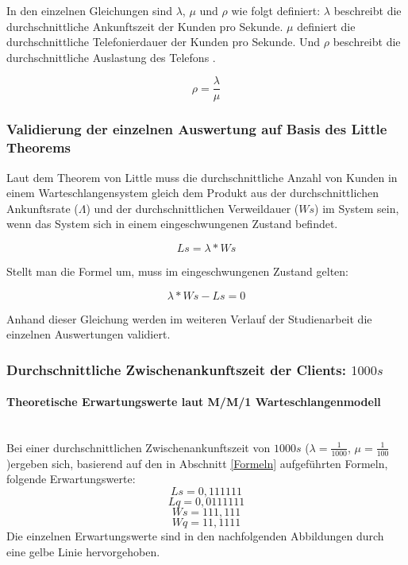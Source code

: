 In den einzelnen Gleichungen sind $\lambda$, $\mu$ und $\rho$ wie folgt definiert: $\lambda$ beschreibt die durchschnittliche Ankunftszeit der Kunden pro Sekunde. $\mu$ definiert die durchschnittliche Telefonierdauer der Kunden pro Sekunde. Und $\rho$ beschreibt die durchschnittliche Auslastung des Telefons \cite{MM1Formeln}. 

\begin{equation}
\rho=\frac{\lambda}{\mu}
\end{equation}

\subsubsection{Validierung der einzelnen Auswertung auf Basis des Little Theorems}
Laut dem Theorem von Little muss die durchschnittliche Anzahl von Kunden in einem Warteschlangensystem gleich dem Produkt aus der durchschnittlichen Ankunftsrate ($\Lambda$) und der durchschnittlichen Verweildauer ($Ws$) im System sein, wenn das System sich in einem eingeschwungenen Zustand befindet.

\begin{equation}
Ls=\lambda*Ws
\end{equation}

Stellt man die Formel um, muss im eingeschwungenen Zustand gelten:

\begin{equation}
\label{eq:little}
\lambda*Ws - Ls=0
\end{equation}

Anhand dieser Gleichung werden im weiteren Verlauf der Studienarbeit die einzelnen Auswertungen validiert.

\subsubsection{Durchschnittliche Zwischenankunftszeit der Clients: $1000s$}

\paragraph{Theoretische Erwartungswerte laut M/M/1 Warteschlangenmodell}
\\
Bei einer durchschnittlichen Zwischenankunftszeit von $1000s$ ($\lambda=\frac{1}{1000}$, $\mu=\frac{1}{100}$)ergeben sich, basierend auf den in Abschnitt \ref{Formeln} aufgeführten Formeln, folgende Erwartungswerte:
\begin{equation}
Ls=0,111111
\end{equation}
\begin{equation}
Lq=0,0111111
\end{equation}
\begin{equation}
Ws=111,111
\end{equation}
\begin{equation}
Wq=11,1111
\end{equation}
Die einzelnen Erwartungswerte sind in den nachfolgenden Abbildungen durch eine gelbe Linie hervorgehoben.

